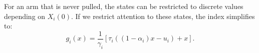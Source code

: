 \documentclass[conference]{IEEEtran}
\begin{document}
For an arm that is never pulled, the states can be restricted to discrete values depending on $X_i(0)$. If we restrict attention to these states, the index simplifies to:
\begin{equation}
    g_i(x)=\frac{1}{\gamma_i}\left [ \tau_i ((1-\alpha_i)x - u_i) + x \right ].
\end{equation}

%
%



%
%
\end{document}
